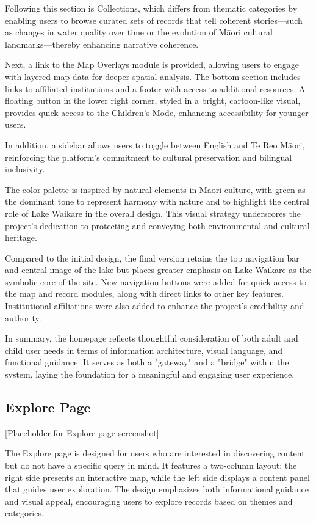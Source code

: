 Following this section is Collections, which differs from thematic categories by enabling users to browse curated sets of records that tell coherent stories—such as changes in water quality over time or the evolution of Māori cultural landmarks—thereby enhancing narrative coherence.

Next, a link to the Map Overlays module is provided, allowing users to engage with layered map data for deeper spatial analysis. The bottom section includes links to affiliated institutions and a footer with access to additional resources. A floating button in the lower right corner, styled in a bright, cartoon-like visual, provides quick access to the Children's Mode, enhancing accessibility for younger users.

In addition, a sidebar allows users to toggle between English and Te Reo Māori, reinforcing the platform's commitment to cultural preservation and bilingual inclusivity.

The color palette is inspired by natural elements in Māori culture, with green as the dominant tone to represent harmony with nature and to highlight the central role of Lake Waikare in the overall design. This visual strategy underscores the project's dedication to protecting and conveying both environmental and cultural heritage.

Compared to the initial design, the final version retains the top navigation bar and central image of the lake but places greater emphasis on Lake Waikare as the symbolic core of the site. New navigation buttons were added for quick access to the map and record modules, along with direct links to other key features. Institutional affiliations were also added to enhance the project's credibility and authority.

In summary, the homepage reflects thoughtful consideration of both adult and child user needs in terms of information architecture, visual language, and functional guidance. It serves as both a "gateway" and a "bridge" within the system, laying the foundation for a meaningful and engaging user experience.

\subsection{Explore Page}
[Placeholder for Explore page screenshot]

The Explore page is designed for users who are interested in discovering content but do not have a specific query in mind. It features a two-column layout: the right side presents an interactive map, while the left side displays a content panel that guides user exploration. The design emphasizes both informational guidance and visual appeal, encouraging users to explore records based on themes and categories.

